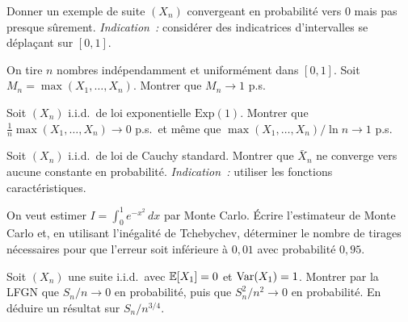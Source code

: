 \begin{exercice}
Donner un exemple de suite $(X_n)$ convergeant en probabilit\'e vers 0 mais pas
presque s\^urement.
\textit{Indication~:} consid\'erer des indicatrices d'intervalles se d\'epla\c{c}ant
sur $[0,1]$.
\end{exercice}

\begin{exercice}
On tire $n$ nombres ind\'ependamment et uniform\'ement dans $[0,1]$. Soit
$M_n = \max(X_1, \ldots, X_n)$. Montrer que $M_n \to 1$ p.s.
\end{exercice}

\begin{exercice}
Soit $(X_n)$ i.i.d.\ de loi exponentielle $\text{Exp}(1)$. Montrer que
$\frac{1}{n}\max(X_1, \ldots, X_n) \to 0$ p.s.\ et m\^eme que
$\max(X_1,\ldots,X_n)/\ln n \to 1$ p.s.
\end{exercice}

\begin{exercice}
Soit $(X_n)$ i.i.d.\ de loi de Cauchy standard. Montrer que $\bar{X}_n$ ne converge
vers aucune constante en probabilit\'e. \textit{Indication~:} utiliser les fonctions
caract\'eristiques.
\end{exercice}

\begin{exercice}
On veut estimer $I = \int_0^1 e^{-x^2}\, dx$ par Monte Carlo. \'Ecrire
l'estimateur de Monte Carlo et, en utilisant l'in\'egalit\'e de Tchebychev,
d\'eterminer le nombre de tirages n\'ecessaires pour que l'erreur soit inf\'erieure
\`a $0{,}01$ avec probabilit\'e $0{,}95$.
\end{exercice}

\begin{exercice}
Soit $(X_n)$ une suite i.i.d.\ avec $\mathbb{E}[X_1] = 0$ et $\mathrm{Var}(X_1) = 1$. Montrer
par la LFGN que $S_n/n \to 0$ en probabilit\'e, puis que $S_n^2/n^2 \to 0$ en
probabilit\'e. En d\'eduire un r\'esultat sur $S_n/n^{3/4}$.
\end{exercice}
